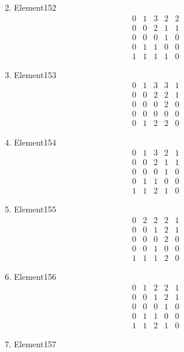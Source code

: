\documentclass[12pt]{article}
\begin{document}
\begin{multicols}{3}
\begin{enumerate}
\begin{equation*}
\end{equation*}
\item Element152
\begin{equation*}
\begin{array}{ccccc}
0&1&3&2&2\\
0&0&2&1&1\\
0&0&0&1&0\\
0&1&1&0&0\\
1&1&1&1&0
\end{array}
\end{equation*}
\item Element153
\begin{equation*}
\begin{array}{ccccc}
0&1&3&3&1\\
0&0&2&2&1\\
0&0&0&2&0\\
0&0&0&0&0\\
0&1&2&2&0
\end{array}
\end{equation*}
\item Element154
\begin{equation*}
\begin{array}{ccccc}
0&1&3&2&1\\
0&0&2&1&1\\
0&0&0&1&0\\
0&1&1&0&0\\
1&1&2&1&0
\end{array}
\end{equation*}
\item Element155
\begin{equation*}
\begin{array}{ccccc}
0&2&2&2&1\\
0&0&1&2&1\\
0&0&0&2&0\\
0&0&1&0&0\\
1&1&1&2&0
\end{array}
\end{equation*}
\item Element156
\begin{equation*}
\begin{array}{ccccc}
0&1&2&2&1\\
0&0&1&2&1\\
0&0&0&1&0\\
0&1&1&0&0\\
1&1&2&1&0
\end{array}
\end{equation*}
\item Element157

\end{enumerate}
\end{multicols}
\end{document}
